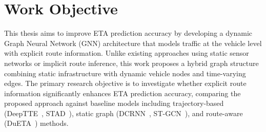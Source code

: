 \section{Work Objective}

This thesis aims to improve ETA prediction accuracy by developing a dynamic Graph Neural Network (GNN) architecture that models traffic at the vehicle level with explicit route information. Unlike existing approaches using static sensor networks or implicit route inference, this work proposes a hybrid graph structure combining static infrastructure with dynamic vehicle nodes and time-varying edges. The primary research objective is to investigate whether explicit route information significantly enhances ETA prediction accuracy, comparing the proposed approach against baseline models including trajectory-based (DeepTTE~\cite{deepTTE2018}, STAD~\cite{abbar2020stad}), static graph (DCRNN~\cite{dcrnn2018}, ST-GCN~\cite{yu2018stgcn}), and route-aware (DuETA~\cite{dueta2023}) methods.

